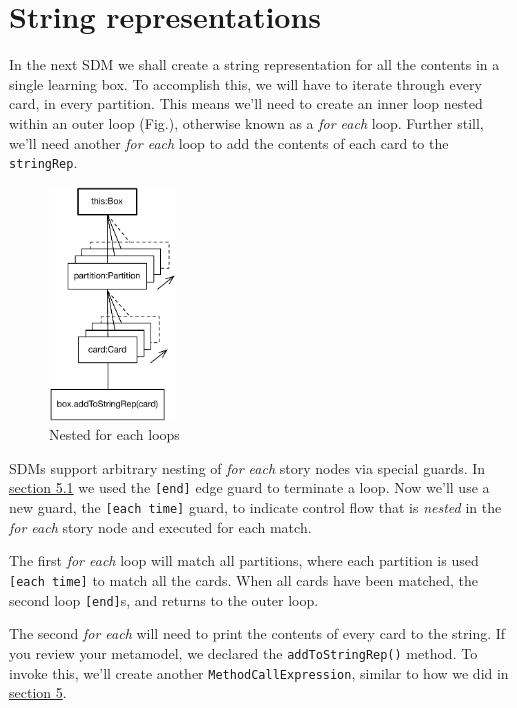 \newpage
\section{String representations}
\genHeader
\hypertarget{sec:stringRep}{}

In the next SDM we shall create a string representation for all the contents in a single learning box. To accomplish this, we will have to iterate through 
every card, in every partition. This means we'll need to create an inner loop nested within an outer loop (Fig.), otherwise known as a \emph{for each} loop.
Further still, we'll need another \emph{for each} loop to add the contents of each card to the \texttt{stringRep}.

\begin{figure}[htbp]
	\centering
	\includegraphics[width=0.3\textwidth]{goal_stringRep.pdf}
	\caption{Nested for each loops}
	\label{fig:goal_stringRep}
\end{figure}
\FloatBarrier

SDMs support arbitrary nesting of \emph{for each} story nodes via special guards. In \hyperlink{emptyPartition vis}{section 5.1} we used the \texttt{[end]} edge
guard to terminate a loop. Now we'll use a new guard, the \texttt{[each time]} guard, to indicate control flow that is \emph{nested} in
the \emph{for each} story node and executed for each match.

The first \emph{for each} loop will match all partitions, where each partition is used \texttt{[each time]} to match all the cards.  When 
all cards have been matched, the second loop \texttt{[end]}s, and returns to the outer loop.

The second \emph{for each} will need to print the contents of every card to the string. If you review your metamodel, we declared the \texttt{addToStringRep()}
method. To invoke this, we'll create another \texttt{MethodCallExpression}, similar to how we did in \hyperlink{sec:growBox}{section 5}.


 



